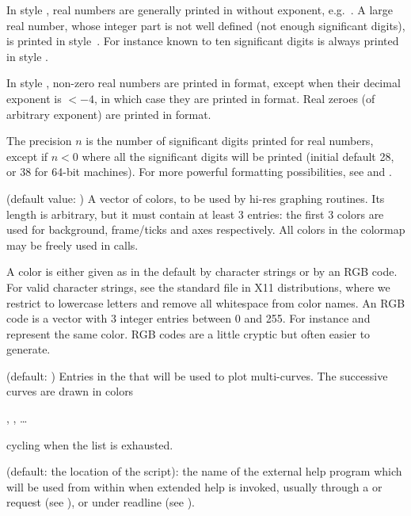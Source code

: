 \item In style , real numbers are generally printed in  without exponent, e.g.~. A large
real number, whose integer part is not well defined (not enough significant
digits), is printed in style~. For instance  known to
ten significant digits is always printed in style .

\item In style , non-zero real numbers are printed in  format,
except when their decimal exponent is $< -4$, in which case they are printed in
 format. Real zeroes (of arbitrary exponent) are printed in 
format.

The precision $n$ is the number of significant digits printed for real
numbers, except if $n<0$ where all the significant digits will be printed
(initial default 28, or 38 for 64-bit machines). For more powerful formatting
possibilities, see  and .

 (default value: ) A vector of colors, to be
used by hi-res graphing routines. Its length is arbitrary, but it must
contain at least 3 entries: the first 3 colors are used for background,
frame/ticks and axes respectively. All colors in the colormap may be freely
used in  calls.

A color is either given as in the default by character strings or by an RGB
code. For valid character strings, see the standard  file in X11
distributions, where we restrict to lowercase letters and remove all
whitespace from color names. An RGB code is a vector with 3 integer entries
between 0 and 255. For instance \kbd{[250, 235, 215]} and  represent the same color. RGB codes are a little cryptic but often
easier to generate.

 (default: \kbd{[4,5]}) Entries in the
 that will be used to plot multi-curves. The successive
curves are drawn in colors

  , ,
  \dots

cycling when the  list is exhausted.

 (default: the location of the  script): the
name of the external help program which will be used from within  when
extended help is invoked, usually through a  or  request
(see ), or  under readline (see
).

